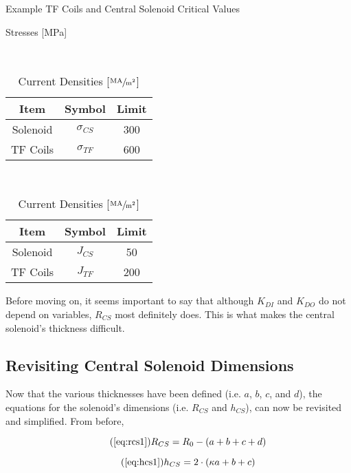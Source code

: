\begin{table}[h!]
\centering	
\caption{Example TF Coils and Central Solenoid Critical Values}
\hfill
\begin{subtable}[t]{0.45\textwidth}
\centering	
\caption{Stresses [MPa]} ~\\
\begin{tabular}{ c|c|c } 

\textbf{Item} & \textbf{Symbol} & \textbf{Limit} \\
\hline
Solenoid & $\sigma_{CS}$ & 300 \\ 
TF Coils & $\sigma_{TF}$ & 600 \\ 
\end{tabular}
\end{subtable}
\hfill
\begin{subtable}[t]{0.45\textwidth}
\centering	
\caption{Current Densities [$\sfrac{\textnormal{MA}}{\textnormal{m}^2}$]} ~\\
\begin{tabular}{ c|c|c } 

\textbf{Item} & \textbf{Symbol} & \textbf{Limit} \\
\hline
Solenoid & $J_{CS}$ & 50 \\ 
TF Coils & $J_{TF}$ & 200 \\ 
\end{tabular}
\end{subtable}
\hfill
\hfill
\end{table}

Before moving on, it seems important to say that although $K_{DI}$ and $K_{DO}$ do not depend on  variables, $R_{CS}$ most definitely does. This is what makes the central solenoid's thickness difficult.

\subsection{Revisiting Central Solenoid Dimensions}

Now that the various thicknesses have been defined (i.e. $a$, $b$, $c$, and $d$), the equations for the solenoid's dimensions (i.e. $R_{CS}$ and $h_{CS}$), can now be revisited and simplified. From before,

 \begin{equation}
 	\tag{\ref{eq:rcs1}}
 	R_{CS} = R_0 - ( a + b + c + d )
 \end{equation}
 
 \begin{equation}
	\tag{\ref{eq:hcs1}}
 	h_{CS} = 2 \cdot \left ( \kappa a + b + c \right)
 \end{equation}

